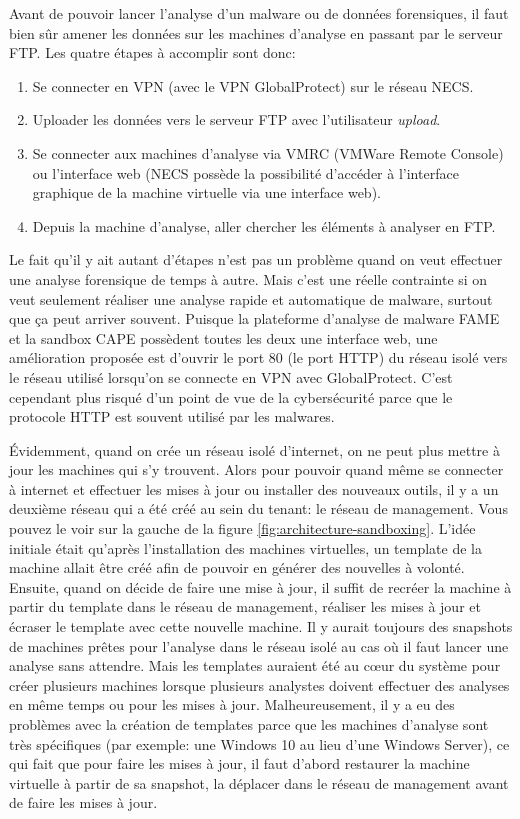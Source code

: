 Avant de pouvoir lancer l'analyse d'un malware ou de données forensiques, il faut bien sûr amener les données sur les machines d'analyse en passant par le serveur FTP. Les quatre étapes à accomplir sont donc:

\begin{enumerate}
    \item Se connecter en VPN (avec le VPN GlobalProtect) sur le réseau NECS.
    \item Uploader les données vers le serveur FTP avec l'utilisateur \textit{upload}.
    \item Se connecter aux machines d'analyse via VMRC (VMWare Remote Console) ou l'interface web (NECS possède la possibilité d'accéder à l'interface graphique de la machine virtuelle via une interface web).
    \item Depuis la machine d'analyse, aller chercher les éléments à analyser en FTP.
\end{enumerate}

Le fait qu'il y ait autant d'étapes n'est pas un problème quand on veut effectuer une analyse forensique de temps à autre. Mais c'est une réelle contrainte si on veut seulement réaliser une analyse rapide et automatique de malware, surtout que ça peut arriver souvent. Puisque la plateforme d'analyse de malware FAME et la sandbox CAPE possèdent toutes les deux une interface web, une amélioration proposée est d'ouvrir le port 80 (le port HTTP) du réseau isolé vers le réseau utilisé lorsqu'on se connecte en VPN avec GlobalProtect. C'est cependant plus risqué d'un point de vue de la cybersécurité parce que le protocole HTTP est souvent utilisé par les malwares.

Évidemment, quand on crée un réseau isolé d'internet, on ne peut plus mettre à jour les machines qui s'y trouvent. Alors pour pouvoir quand même se connecter à internet et effectuer les mises à jour ou installer des nouveaux outils, il y a un deuxième réseau qui a été créé au sein du tenant: le réseau de management. Vous pouvez le voir sur la gauche de la figure \ref{fig:architecture-sandboxing}. L'idée initiale était qu'après l'installation des machines virtuelles, un template de la machine allait être créé afin de pouvoir en générer des nouvelles à volonté. Ensuite, quand on décide de faire une mise à jour, il suffit de recréer la machine à partir du template dans le réseau de management, réaliser les mises à jour et écraser le template avec cette nouvelle machine. Il y aurait toujours des snapshots de machines prêtes pour l'analyse dans le réseau isolé au cas où il faut lancer une analyse sans attendre. Mais les templates auraient été au cœur du système pour créer plusieurs machines lorsque plusieurs analystes doivent effectuer des analyses en même temps ou pour les mises à jour. Malheureusement, il y a eu des problèmes avec la création de templates parce que les machines d'analyse sont très spécifiques (par exemple: une Windows 10 au lieu d'une Windows Server), ce qui fait que pour faire les mises à jour, il faut d'abord restaurer la machine virtuelle à partir de sa snapshot, la déplacer dans le réseau de management avant de faire les mises à jour.

